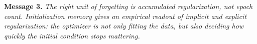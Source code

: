 \documentclass{article}
\newcommand{\pier}[1]{{\color{red} Pier: #1}}
\begin{document}
\begin{summarybox}
\textbf{Message 3.} \textit{The right unit of forgetting is accumulated regularization, not
epoch count.  Initialization memory gives an empirical readout of
implicit and explicit regularization: the optimizer is not only fitting
the data, but also deciding how quickly the initial condition stops
mattering.}
\end{summarybox}











\end{document}
